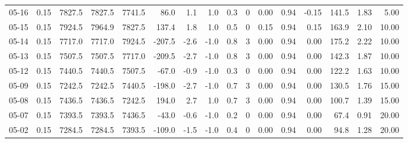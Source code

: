 \begin{threeparttable}
{\begin{tabular}{lrrrrrrrrrrrrrrr}
  05-16 &     0.15 & 7827.5 & 7827.5 & 7741.5 &       86.0 &            1.1 &                      1.0 &                 0.3 &              0 &       0.00 &      0.94 &          -0.15 &            141.5 &            1.83 &                   5.00 \\
  05-15 &     0.15 & 7924.5 & 7964.9 & 7827.5 &      137.4 &            1.8 &                      1.0 &                 0.5 &              0 &       0.15 &      0.94 &           0.15 &            163.9 &            2.10 &                  10.00 \\
  05-14 &     0.15 & 7717.0 & 7717.0 & 7924.5 &     -207.5 &           -2.6 &                     -1.0 &                 0.8 &              3 &       0.00 &      0.94 &           0.00 &            175.2 &            2.22 &                  10.00 \\
  05-13 &     0.15 & 7507.5 & 7507.5 & 7717.0 &     -209.5 &           -2.7 &                     -1.0 &                 0.8 &              3 &       0.00 &      0.94 &           0.00 &            142.3 &            1.87 &                  10.00 \\
  05-12 &     0.15 & 7440.5 & 7440.5 & 7507.5 &      -67.0 &           -0.9 &                     -1.0 &                 0.3 &              0 &       0.00 &      0.94 &           0.00 &            122.2 &            1.63 &                  10.00 \\
  05-09 &     0.15 & 7242.5 & 7242.5 & 7440.5 &     -198.0 &           -2.7 &                     -1.0 &                 0.7 &              3 &       0.00 &      0.94 &           0.00 &            130.5 &            1.76 &                  15.00 \\
  05-08 &     0.15 & 7436.5 & 7436.5 & 7242.5 &      194.0 &            2.7 &                      1.0 &                 0.7 &              3 &       0.00 &      0.94 &           0.00 &            100.7 &            1.39 &                  15.00 \\
  05-07 &     0.15 & 7393.5 & 7393.5 & 7436.5 &      -43.0 &           -0.6 &                     -1.0 &                 0.2 &              0 &       0.00 &      0.94 &           0.00 &             67.4 &            0.91 &                  20.00 \\
  05-02 &     0.15 & 7284.5 & 7284.5 & 7393.5 &     -109.0 &           -1.5 &                     -1.0 &                 0.4 &              0 &       0.00 &      0.94 &           0.00 &             94.8 &            1.28 &                  20.00 \\

\end{tabular}}
\end{threeparttable}
